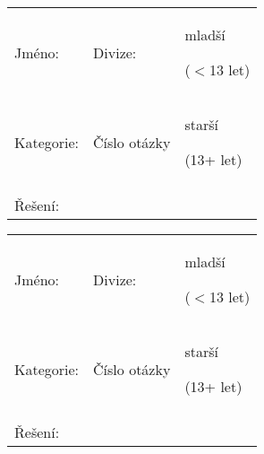 \documentclass[a4paper, 10pt]{article}
\begin{document}

\begin{minipage}{0.5\textwidth}
	\begin{table}[H]
		\ttfamily
		\begin{tabularx}{\textwidth}{XXX}
			Jméno: & Divize: & mladší
			
			($<$13 let)\\
			Kategorie: & Číslo otázky & starší
			
			(13+ let)\\
			&&\\
			Řešení: &&\\
			
		\end{tabularx}
	\end{table}
\end{minipage}
\begin{minipage}{0.5\textwidth}
	\begin{table}[H]
		\ttfamily
		\begin{tabularx}{\textwidth}{XXX}
			Jméno: & Divize: & mladší
			
			($<$13 let)\\
			Kategorie: & Číslo otázky & starší
			
			(13+ let)\\
			&&\\
			Řešení: &&\\
			
		\end{tabularx}
	\end{table}
\end{minipage}

\end{document}
